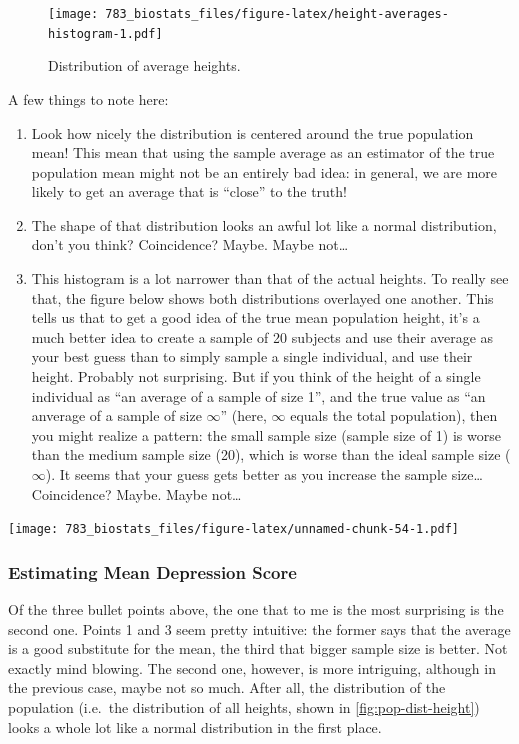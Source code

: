 \documentclass[]{book}
\providecommand{\tightlist}{%
  \setlength{\itemsep}{0pt}\setlength{\parskip}{0pt}}
\theoremstyle{definition}
\theoremstyle{definition}
\theoremstyle{definition}
\theoremstyle{remark}
\begin{document}
\begin{figure}
\centering
\texttt{[image: 783\_biostats\_files/figure-latex/height-averages-histogram-1.pdf]}
\caption{\label{fig:height-averages-histogram}Distribution of average heights.}
\end{figure}

A few things to note here:

\begin{enumerate}
\def\labelenumi{\arabic{enumi}.}
\tightlist
\item
  Look how nicely the distribution is centered around the true population mean! This mean that using the sample average as an estimator of the true population mean might not be an entirely bad idea: in general, we are more likely to get an average that is ``close'' to the truth!
\item
  The shape of that distribution looks an awful lot like a normal distribution, don't you think? Coincidence? Maybe. Maybe not\ldots{}
\item
  This histogram is a lot narrower than that of the actual heights. To really see that, the figure below shows both distributions overlayed one another. This tells us that to get a good idea of the true mean population height, it's a much better idea to create a sample of 20 subjects and use their average as your best guess than to simply sample a single individual, and use their height. Probably not surprising. But if you think of the height of a single individual as ``an average of a sample of size 1'', and the true value as ``an anverage of a sample of size \(\infty\)'' (here, \(\infty\) equals the total population), then you might realize a pattern: the small sample size (sample size of 1) is worse than the medium sample size (20), which is worse than the ideal sample size (\(\infty\)). It seems that your guess gets better as you increase the sample size\ldots{} Coincidence? Maybe. Maybe not\ldots{}
\end{enumerate}

\texttt{[image: 783\_biostats\_files/figure-latex/unnamed-chunk-54-1.pdf]}

\hypertarget{estimating-mean-depression-score}{%
\subsubsection*{Estimating Mean Depression Score}\label{estimating-mean-depression-score}}

Of the three bullet points above, the one that to me is the most surprising is the second one. Points 1 and 3 seem pretty intuitive: the former says that the average is a good substitute for the mean, the third that bigger sample size is better. Not exactly mind blowing. The second one, however, is more intriguing, although in the previous case, maybe not so much. After all, the distribution of the population (i.e.~the distribution of all heights, shown in \ref{fig:pop-dist-height}) looks a whole lot like a normal distribution in the first place.
\end{document}
